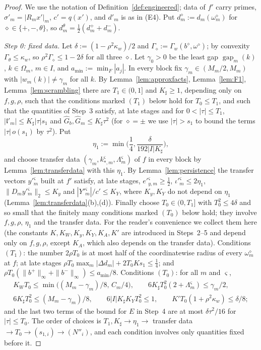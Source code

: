 \documentclass[10pt]{amsart}
\theoremstyle{definition}
\theoremstyle{remark}
\newcommand{\gap}{\operatorname{gap}}
\newcommand{\lin}{\mathfrak l}
\begin{document}
\begin{proof}
We use the notation of Definition~\ref{def:engineered}; data of $f'$ carry
primes, $\sigma'_m=|R_mx'|_m$, $c'=q(x')$, and $d'_m$ is as in (E4).  Put
$d^\diamond_m:=d_m(\omega^\diamond_m)$ for $\diamond\in\{+,-,\theta\}$, so
$d^\theta_m=\frac12(d^+_m+d^-_m)$.

\emph{Step 0: fixed data.}  Let $\delta:=(1-\rho^2\kappa_w)/2$ and
$\Gamma_\diamond:=\Gamma_w(b^\diamond,\omega^\diamond)$; by convexity
$\Gamma_\theta\le\kappa_w$, so $\rho^2\Gamma_\diamond\le1-2\delta$ for all
three $\diamond$.  Let $\gamma_0>0$ be the least gap $\gap_m(k)$, $k\in
\Omega_m$, $m\in I$, and $a_{\min}:=\min_F|a_j|$.  In every block fix
$\gamma_m\in(M_m/2,M_m)$ with $|w_m(k)|\ne\gamma_m$ for all $k$.  By
Lemma~\ref{lem:approxfacts}, Lemma~\ref{lem:F1}, Lemma~\ref{lem:scrambling}
there are $T_1\in(0,1]$ and $K_{\sharp}\ge1$, depending only on $f,g,\rho$, such
that the conditions marked $(T_1)$ below hold for $T_0\le T_1$, and such
that the quantities of Step~3 satisfy, at late stages and for
$0<|\tau|\le T_1$, $|\lin'_m|\le K_{\sharp}|\tau|s_1$ and $\hat G_b,\hat G_m\le
K_{\sharp}\tau^2$ (for $\diamond=\pm$ we use $|\tau|>s_1$ to bound the terms
$|\tau|\,o(s_1)$ by $\tau^2$).  Put
\[
 \eta_1:=\min\Big(\frac14,\frac\delta{192|I|K_{\sharp}}\Big),
\]
and choose transfer data $(\gamma_m,k^\varsigma_{*,m},\Lambda^\varsigma_m)$ of
$f$ in every block by Lemma~\ref{lem:transferdata} with this $\eta_1$.  By
Lemma~\ref{lem:persistence} the transfer vectors $y'^\varsigma_m$ built at
$f'$ satisfy, at late stages, $e'^\varsigma_{y,m}\ge\frac12$,
$\iota'^\varsigma_m\le2\eta_1$, $\|D_my'^\varsigma_m\|_2\le K_y$ and
$|Y'^\varsigma_m|/c'\le K_Y$, where $K_y,K_Y$ do not depend on $\eta_1$
(Lemma~\ref{lem:transferdata}(b),(d)).  Finally choose $T_0\in(0,T_1]$ with
$T_0^2\le4\delta$ and so small that the finitely many conditions marked
$(T_0)$ below hold; they involve $f,g,\rho$, $\eta_1$ and the transfer
data.  For the reader's convenience we collect them here (the constants
$K,K_W,K_y,K_Y,K_A,K'$ are introduced in Steps~2--5 and depend only on
$f,g,\rho$, except $K_A$, which also depends on the transfer data).
Conditions $(T_1)$: the number $2\rho T_0$ is at most half of the
coordinatewise radius of every $\omega^\diamond_m$ at $f$; at late stages
$\rho T_0\max_m|\Delta d_m|+2T_0Ks_1\le\frac14$; and $\rho
T_0(\|b^+\|_\infty+\|b^-\|_\infty)\le a_{\min}/8$.  Conditions $(T_0)$:
for all $m$ and $\varsigma$,
\begin{gather*}
 K_WT_0\le\min\big((M_m-\gamma_m)/8,\,C_m/4\big),\qquad
 6K_{\sharp}T_0^2(2+\Lambda^\varsigma_m)\le\gamma_m/2,\\
 6K_{\sharp}T_0^2\le(M_m-\gamma_m)/8,\qquad 6|I|K_{\sharp}K_YT_0^2\le1,
 \qquad K'T_0(1+\rho^2\kappa_w)\le\delta/8;
\end{gather*}
and the last two terms of the bound for $E$ in Step~4 are at most
$\delta\tau^2/16$ for $|\tau|\le T_0$.  The order of choices is $T_1,K_{\sharp}\to\eta_1\to$ transfer data
$\to T_0\to(s_{1,i})\to(N''_i)$, and each condition involves only
quantities fixed before it.


\end{proof}
\end{document}
